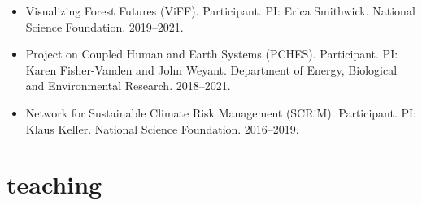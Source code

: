 \documentclass[11pt,article,oneside]{memoir}
\begin{document}
\begin{itemize}[label={}]

\item Visualizing Forest Futures (ViFF). Participant. PI: Erica Smithwick. National Science Foundation. 2019--2021.

\item Project on Coupled Human and Earth Systems (PCHES). Participant. PI: Karen Fisher-Vanden and John Weyant. Department of Energy, Biological and Environmental Research. 2018--2021.

\item Network for Sustainable Climate Risk Management (SCRiM). Participant. PI: Klaus Keller. National Science Foundation. 2016--2019.

\end{itemize}


\section{teaching}

\mbox{}\vspace{-\dimexpr\baselineskip\relax}

\vspace{\baselineskip}
\end{document}

